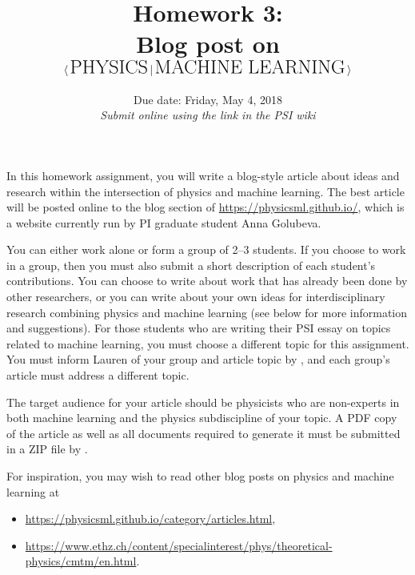 \documentclass[letterpaper]{scrartcl}
\begin{document}

\vspace{-3cm}

\title{Homework 3: \\ Blog post on
$\langle \, \text{\LARGE PHYSICS} \, \vert \, \text{\LARGE MACHINE LEARNING} \, \rangle$ \vspace*{-6mm}}

\date{Due date: Friday, May 4, 2018 \\ \textit{\normalsize{Submit online using the link in the PSI wiki}}}

\maketitle

In this homework assignment, you will write a blog-style article about ideas and research within the intersection of physics and machine learning.
The best article will be posted online to the blog section of {\small\url{https://physicsml.github.io/}}, 
which is a website currently run by PI graduate student Anna Golubeva.

You can either work alone or form a group of 2--3 students. 
If you choose to work in a group, then you must also submit a short description of each student's contributions.
You can choose to write about work that has already been done by other researchers, 
or you can write about your own ideas for interdisciplinary research combining physics and machine learning
(see below for more information and suggestions).
For those students who are writing their PSI essay on topics related to machine learning, 
you must choose a different topic for this assignment.
You must inform Lauren of your group and article topic by 
\normalfont,
and each group's article must address a different topic.

The target audience for your article should be physicists who are non-experts in 
both machine learning and the physics subdiscipline of your topic.
A PDF copy of the article as well as all documents required to generate it must be submitted in a ZIP file by
\normalfont.

For inspiration, you may wish to read other blog posts on physics and machine learning at
\vspace*{-1mm}\begin{itemize}[leftmargin=*,labelindent=2mm,itemsep=-1mm,label=$\circ$]
\item {\small\url{https://physicsml.github.io/category/articles.html}}, 
\item {\small\url{https://www.ethz.ch/content/specialinterest/phys/theoretical-physics/cmtm/en.html}}.
\end{itemize}
\end{document}
